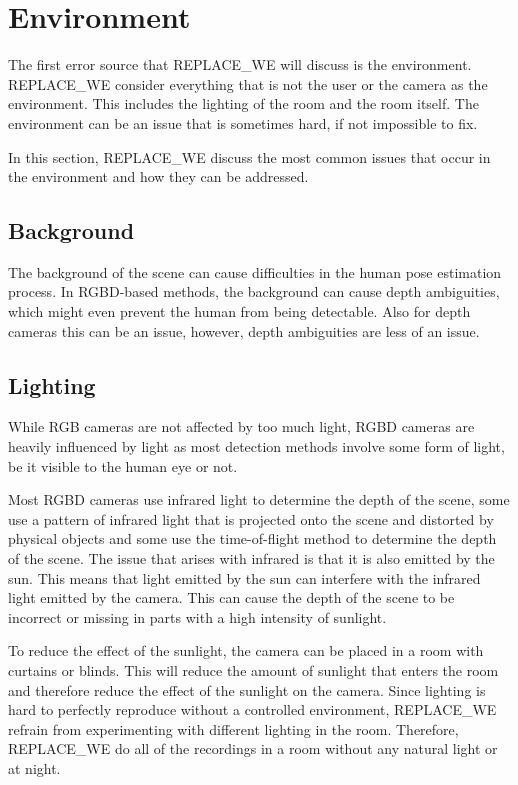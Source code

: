 \section{Environment}

The first error source that REPLACE_WE will discuss is the environment. REPLACE_WE consider everything that is not the user or the camera as the environment. This includes the lighting of the room and the room itself. The environment can be an issue that is sometimes hard, if not impossible to fix. 

In this section, REPLACE_WE discuss the most common issues that occur in the environment and how they can be addressed.

\subsection{Background}

The background of the scene can cause difficulties in the human pose estimation process. In RGBD-based methods, the background can cause depth ambiguities, which might even prevent the human from being detectable. Also for depth cameras this can be an issue, however, depth ambiguities are less of an issue.

\subsection{Lighting}

While RGB cameras are not affected by too much light, RGBD cameras are heavily influenced by light as most detection methods involve some form of light, be it visible to the human eye or not.

Most RGBD cameras use infrared light to determine the depth of the scene, some use a pattern of infrared light that is projected onto the scene and distorted by physical objects and some use the time-of-flight method to determine the depth of the scene. The issue that arises with infrared is that it is also emitted by the sun. This means that light emitted by the sun can interfere with the infrared light emitted by the camera. This can cause the depth of the scene to be incorrect or missing in parts with a high intensity of sunlight.

To reduce the effect of the sunlight, the camera can be placed in a room with curtains or blinds. This will reduce the amount of sunlight that enters the room and therefore reduce the effect of the sunlight on the camera. Since lighting is hard to perfectly reproduce without a controlled environment, REPLACE_WE refrain from experimenting with different lighting in the room. Therefore, REPLACE_WE do all of the recordings in a room without any natural light or at night.


